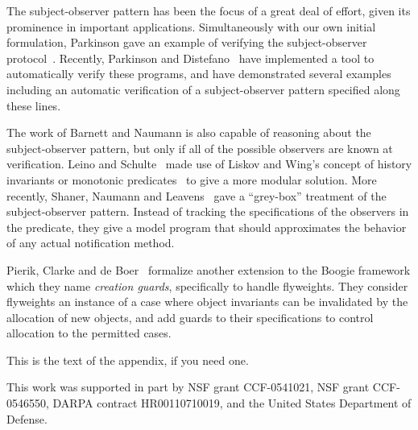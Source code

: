 \documentclass[preprint,natbib]{sigplanconf}
\begin{document}
The subject-observer pattern has been the focus of a great deal of
effort, given its prominence in important applications. Simultaneously
with our own initial formulation, Parkinson gave an example of
verifying the subject-observer protocol~\cite{parkinson-so}. Recently,
Parkinson and Distefano~\cite{jstar-parkinson-distefano} have
implemented a tool to automatically verify these programs, and have
demonstrated several examples including an automatic verification of a
subject-observer pattern specified along these lines.

The work of Barnett and Naumann is also capable of reasoning about the
subject-observer pattern, but only if all of the possible observers
are known at verification.  Leino and Schulte~\cite{boogie-sub-obs}
made use of Liskov and Wing's concept of history invariants or
monotonic predicates~\cite{liskov-wing} to give a more modular
solution. More recently, Shaner, Naumann and Leavens~\cite{ShanerLN07}
gave a ``grey-box'' treatment of the subject-observer pattern.
Instead of tracking the specifications of the observers in the
predicate, they give a model program that should approximates the
behavior of any actual notification method.

Pierik, Clarke and de Boer~\cite{creational-invariants} formalize another
extension to the Boogie framework which they name \emph{creation
  guards}, specifically to handle flyweights. They consider flyweights
an instance of a case where object invariants can be invalidated by
the allocation of new objects, and add guards to their specifications
to control allocation to the permitted cases. 




This is the text of the appendix, if you need one.

\acks

This work was supported in part by NSF grant
CCF-0541021, NSF grant CCF-0546550, DARPA contract HR00110710019, and
the United States Department of Defense.





% 
% 
% 
% 
\end{document}
